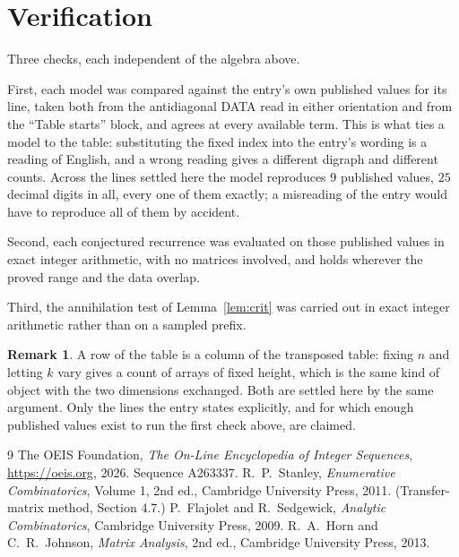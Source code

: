 \documentclass[11pt,a4paper]{article}
\theoremstyle{plain}
\theoremstyle{definition}
\newtheorem{remark}[theorem]{Remark}
\begin{document}
\section{Verification}

Three checks, each independent of the algebra above.

First, each model was compared against the entry's own published values for its line, taken
both from the antidiagonal DATA read in either orientation and from the ``Table starts''
block, and agrees at every available term. This is what ties a model to the table:
substituting the fixed index into the entry's wording is a reading of English, and a wrong
reading gives a different digraph and different counts. Across the lines settled here the
model reproduces $9$ published values, $25$ decimal digits in all, every one of
them exactly; a misreading of the entry would have to reproduce all of them by accident.

Second, each conjectured recurrence was evaluated on those published values in exact
integer arithmetic, with no matrices involved, and holds wherever the proved range and the
data overlap.

Third, the annihilation test of Lemma~\ref{lem:crit} was carried out in exact integer
arithmetic rather than on a sampled prefix.

\begin{remark}
A row of the table is a column of the transposed table: fixing $n$ and letting $k$ vary gives a
count of arrays of fixed height, which is the same kind of object with the two dimensions
exchanged. Both are settled here by the same argument. Only the lines the entry states
explicitly, and for which enough published values exist to run the first check above, are
claimed.
\end{remark}

\begin{thebibliography}{9}
 The OEIS Foundation, \emph{The On-Line Encyclopedia of Integer
Sequences}, \url{https://oeis.org}, 2026. Sequence A263337.
 R.~P.~Stanley, \emph{Enumerative Combinatorics}, Volume 1, 2nd ed.,
Cambridge University Press, 2011. (Transfer-matrix method, Section 4.7.)
 P.~Flajolet and R.~Sedgewick, \emph{Analytic Combinatorics}, Cambridge
University Press, 2009.
 R.~A.~Horn and C.~R.~Johnson, \emph{Matrix Analysis}, 2nd ed., Cambridge
University Press, 2013.
\end{thebibliography}
\end{document}
